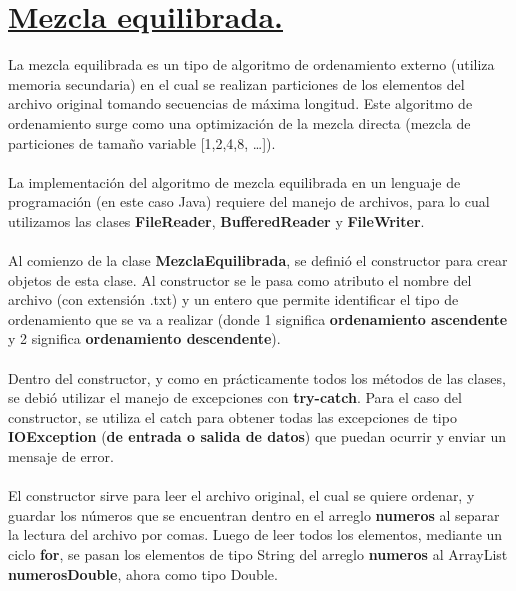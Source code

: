 \documentclass[12pt,letterpaper]{report}
\begin{document}
\section*{\centering \underline{Mezcla equilibrada.}}
La mezcla equilibrada es un tipo de algoritmo de ordenamiento externo (utiliza memoria secundaria) en el cual se realizan particiones de los elementos del archivo original tomando secuencias de máxima longitud. Este algoritmo de ordenamiento surge como una optimización de la mezcla directa (mezcla de particiones de tamaño variable [1,2,4,8, …]).\\\\
La implementación del algoritmo de mezcla equilibrada en un lenguaje de programación (en este caso Java) requiere del manejo de archivos, para lo cual utilizamos las clases \textbf{FileReader}, \textbf{BufferedReader} y \textbf{FileWriter}.\\\\ Al comienzo de la clase \textbf{MezclaEquilibrada}, se definió el constructor para crear objetos de esta clase. Al constructor se le pasa como atributo el nombre del archivo (con extensión .txt) y un entero que permite identificar el tipo de ordenamiento que se va a realizar (donde 1 significa \textbf{ordenamiento ascendente} y 2 significa \textbf{ordenamiento descendente}).\\\\ Dentro del constructor, y como en prácticamente todos los métodos de las clases, se debió utilizar el manejo de excepciones con \textbf{try-catch}. Para el caso del constructor, se utiliza el catch para obtener todas las excepciones de tipo \textbf{IOException} (\textbf{de entrada o salida de datos}) que puedan ocurrir y enviar un mensaje de error.\\\\ El constructor sirve para leer el archivo original, el cual se quiere ordenar, y guardar los números que se encuentran dentro en el arreglo \textbf{numeros} al separar la lectura del archivo por comas. Luego de leer todos los elementos, mediante un ciclo \textbf{for}, se pasan los elementos de tipo String del arreglo \textbf{numeros} al ArrayList \textbf{numerosDouble}, ahora como tipo Double.\\\\
\end{document}
